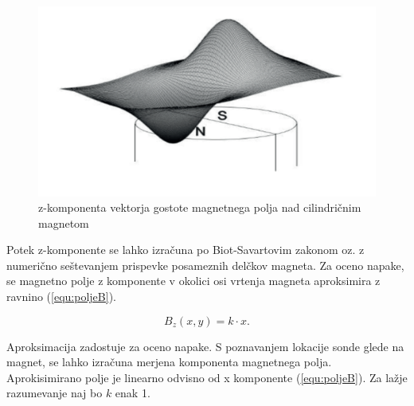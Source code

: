 


\begin{figure}[h]
	\centering
		\includegraphics[width=0.75\columnwidth]{./Slike/magnetno_polje.jpg}
	\caption{z-komponenta vektorja gostote magnetnega polja nad cilindričnim magnetom \cite{AM8192}}
	\label{fig:magnetno_polje}
\end{figure}


Potek z-komponente se lahko izračuna po Biot-Savartovim zakonom oz. z numerično seštevanjem prispevke posameznih delčkov magneta. Za oceno napake, se magnetno polje z komponente v okolici osi vrtenja magneta aproksimira z ravnino (\ref{equ:poljeB}).

\begin{equation}
\label{equ:poljeB}
B_z(x,y)=k\cdot x.
\end{equation}

Aproksimacija zadostuje za oceno napake. S poznavanjem lokacije sonde glede na magnet, se lahko izračuna merjena komponenta magnetnega polja. Aprokisimirano polje je linearno odvisno od x komponente (\ref{equ:poljeB}). Za lažje razumevanje naj bo $k$ enak 1.


